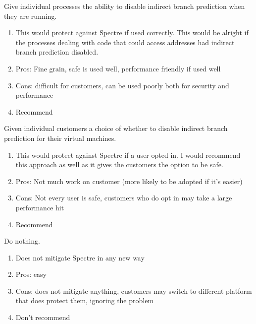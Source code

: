 \documentclass{article}
\begin{document}
\begin{homeworkProblem}[3]
      Give individual processes the ability to disable indirect branch prediction when they are running.
      \begin{enumerate}
      \item This would protect against Spectre if used correctly. This would be alright if the processes 
      dealing with code that could access addresses had indirect branch prediction disabled. 
      \item Pros: Fine grain, safe is used well, performance friendly if used well
      \item Cons: difficult for customers, can be used poorly both for security and performance
      \item Recommend
      \end{enumerate}
      
      Given individual customers a choice of whether to disable indirect branch prediction for their virtual machines.     
       \begin{enumerate}
      \item  This would protect against Spectre if a user opted in. I would recommend this approach as well as it 
      gives the customers the option to be safe. 
      \item Pros: Not much work on customer (more likely to be adopted if it's easier)
      \item Cons: Not every user is safe, customers who do opt in may take a large performance hit
      \item Recommend
      \end{enumerate}
      
      Do nothing.
      \begin{enumerate}
      \item Does not mitigate Spectre in any new way
      \item Pros: easy
      \item Cons: does not mitigate anything, customers may switch to different platform that does protect them, 
      ignoring the problem
      \item Don't recommend
      \end{enumerate}
  \end{homeworkProblem}
\end{document}
